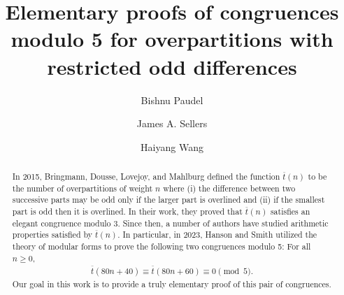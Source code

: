 \documentclass{amsart}
\theoremstyle{definition}
\begin{document}
\title[Congruences for overpartitions with restricted odd differences]{Elementary proofs of congruences modulo 5 for overpartitions with restricted odd differences}

\author[B. Paudel]{Bishnu Paudel}

\author[J. Sellers]{James A. Sellers}

\author[H. Wang]{Haiyang Wang}

\address{Mathematics and Statistics Department\\
         University of Minnesota Duluth\\
         Duluth, MN 55812, USA}




\begin{abstract}
In 2015, Bringmann, Dousse, Lovejoy, and Mahlburg defined the function $\overline{t}(n)$ to be the number of overpartitions of weight $n$ where (i) the difference between two successive parts may be odd only if the larger part is overlined and (ii) if the smallest part is odd then it is overlined.  In their work, they proved that $\overline{t}(n)$ satisfies an elegant congruence modulo 3.  Since then, a number of authors have studied arithmetic properties satisfied by $\overline{t}(n)$.  In particular, in 2023, Hanson and Smith utilized the theory of modular forms to prove the following two congruences modulo 5:  For all $n\geq 0$, 
\begin{align*}
\overline{t}(80n+40)\equiv \overline{t}(80n+60)\equiv 0 \pmod{5}.
\end{align*}
Our goal in this work is to provide a truly elementary proof of this pair of congruences.  
\end{abstract}

\maketitle
\end{document}
